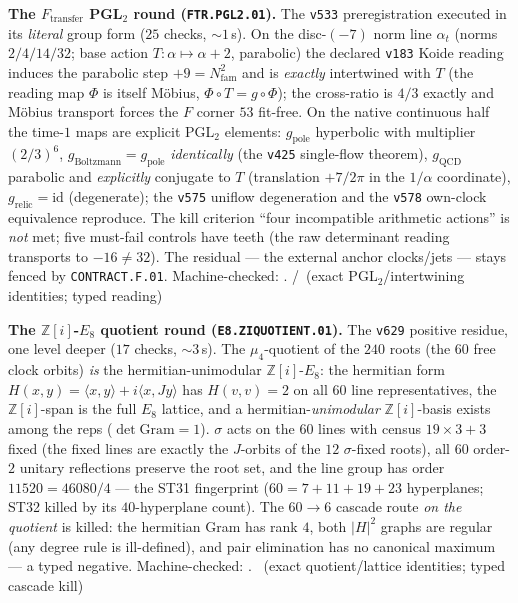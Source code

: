 \par\smallskip\noindent\textbf{The $F_{\mathrm{transfer}}$ PGL$_2$ round
(\texttt{FTR.PGL2.01}).}
The \texttt{v533} preregistration executed in its \emph{literal} group
form ($25$ checks, ${\sim}1$\,s).  On the disc-$(-7)$ norm line
$\alpha_t$ (norms $2/4/14/32$; base action $T:\alpha\mapsto\alpha+2$,
parabolic) the declared \texttt{v183} Koide reading induces the
parabolic step $+9=N_{\mathrm{fam}}^2$ and is \emph{exactly}
intertwined with $T$ (the reading map $\Phi$ is itself M\"obius,
$\Phi\circ T=g\circ\Phi$); the cross-ratio is $4/3$ exactly and
M\"obius transport forces the $F$ corner $53$ fit-free.  On the native
continuous half the time-$1$ maps are explicit PGL$_2$ elements:
$g_{\mathrm{pole}}$ hyperbolic with multiplier $(2/3)^6$,
$g_{\mathrm{Boltzmann}}=g_{\mathrm{pole}}$ \emph{identically} (the
\texttt{v425} single-flow theorem), $g_{\mathrm{QCD}}$ parabolic and
\emph{explicitly} conjugate to $T$ (translation $+7/2\pi$ in the
$1/\alpha$ coordinate), $g_{\mathrm{relic}}=\mathrm{id}$ (degenerate);
the \texttt{v575} uniflow degeneration and the \texttt{v578} own-clock
equivalence reproduce.  The kill criterion ``four incompatible
arithmetic actions'' is \emph{not} met; five must-fail controls have
teeth (the raw determinant reading transports to $-16\ne32$).  The
residual --- the external anchor clocks/jets --- stays fenced by
\texttt{CONTRACT.F.01}.
Machine-checked: .
\mE/\mC\ (exact PGL$_2$/intertwining identities; typed reading)
\par\smallskip

\par\smallskip\noindent\textbf{The $\mathbb Z[i]$-$E_8$ quotient round
(\texttt{E8.ZIQUOTIENT.01}).}
The \texttt{v629} positive residue, one level deeper ($17$ checks,
${\sim}3$\,s).  The $\mu_4$-quotient of the $240$ roots (the $60$ free
clock orbits) \emph{is} the hermitian-unimodular $\mathbb Z[i]$-$E_8$:
the hermitian form $H(x,y)=\langle x,y\rangle+i\langle x,Jy\rangle$
has $H(v,v)=2$ on all $60$ line representatives, the
$\mathbb Z[i]$-span is the full $E_8$ lattice, and a
hermitian-\emph{unimodular} $\mathbb Z[i]$-basis exists among the reps
($\det\mathrm{Gram}=1$).  $\sigma$ acts on the $60$ lines with census
$19\times3+3$ fixed (the fixed lines are exactly the $J$-orbits of the
$12$ $\sigma$-fixed roots), all $60$ order-$2$ unitary reflections
preserve the root set, and the line group has order $11520=46080/4$
--- the ST31 fingerprint ($60=7{+}11{+}19{+}23$ hyperplanes; ST32
killed by its $40$-hyperplane count).  The $60\to6$ cascade route
\emph{on the quotient} is killed: the hermitian Gram has rank $4$,
both $|H|^2$ graphs are regular (any degree rule is ill-defined), and
pair elimination has no canonical maximum --- a typed negative.
Machine-checked: .
\mE\ (exact quotient/lattice identities; typed cascade kill)
\par\smallskip

